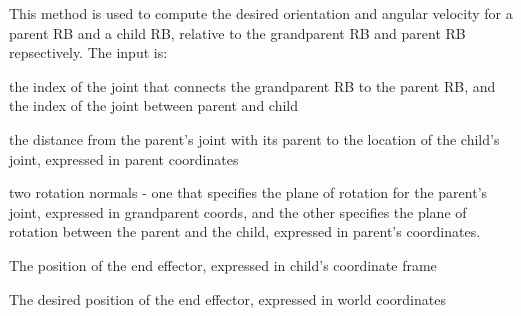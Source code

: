 \label{classCartWheel_1_1Core_1_1IKVMCController_a6e379111a67bc1fae067aa643dc2b5a8}
This method is used to compute the desired orientation and angular velocity for a parent RB and a child RB, relative to the grandparent RB and parent RB repsectively. The input is:
\begin{DoxyItemize}
\item the index of the joint that connects the grandparent RB to the parent RB, and the index of the joint between parent and child
\end{DoxyItemize}


\begin{DoxyItemize}
\item the distance from the parent's joint with its parent to the location of the child's joint, expressed in parent coordinates
\end{DoxyItemize}


\begin{DoxyItemize}
\item two rotation normals -\/ one that specifies the plane of rotation for the parent's joint, expressed in grandparent coords, and the other specifies the plane of rotation between the parent and the child, expressed in parent's coordinates.
\end{DoxyItemize}


\begin{DoxyItemize}
\item The position of the end effector, expressed in child's coordinate frame
\end{DoxyItemize}


\begin{DoxyItemize}
\item The desired position of the end effector, expressed in world coordinates
\end{DoxyItemize}


